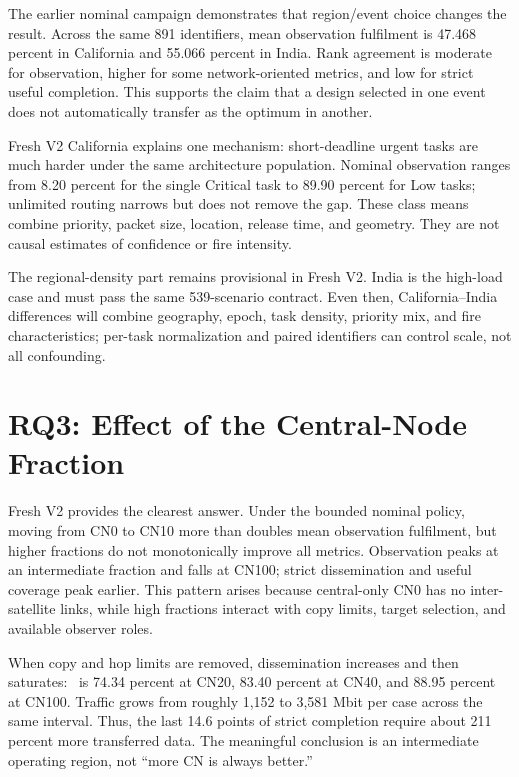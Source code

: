 The earlier nominal campaign demonstrates that region/event choice changes the result. Across the same 891 identifiers, mean observation fulfilment is 47.468 percent in California and 55.066 percent in India. Rank agreement is moderate for observation, higher for some network-oriented metrics, and low for strict useful completion. This supports the claim that a design selected in one event does not automatically transfer as the optimum in another.

Fresh V2 California explains one mechanism: short-deadline urgent tasks are much harder under the same architecture population. Nominal observation ranges from 8.20 percent for the single Critical task to 89.90 percent for Low tasks; unlimited routing narrows but does not remove the gap. These class means combine priority, packet size, location, release time, and geometry. They are not causal estimates of confidence or fire intensity.

The regional-density part remains provisional in Fresh V2. India is the high-load case and must pass the same 539-scenario contract. Even then, California--India differences will combine geography, epoch, task density, priority mix, and fire characteristics; per-task normalization and paired identifiers can control scale, not all confounding.

\section{RQ3: Effect of the Central-Node Fraction}

Fresh V2 provides the clearest answer. Under the bounded nominal policy, moving from CN0 to CN10 more than doubles mean observation fulfilment, but higher fractions do not monotonically improve all metrics. Observation peaks at an intermediate fraction and falls at CN100; strict dissemination and useful coverage peak earlier. This pattern arises because central-only CN0 has no inter-satellite links, while high fractions interact with copy limits, target selection, and available observer roles.

When copy and hop limits are removed, dissemination increases and then saturates: \Suseful\ is 74.34 percent at CN20, 83.40 percent at CN40, and 88.95 percent at CN100. Traffic grows from roughly 1,152 to 3,581 Mbit per case across the same interval. Thus, the last 14.6 points of strict completion require about 211 percent more transferred data. The meaningful conclusion is an intermediate operating region, not ``more CN is always better.''

